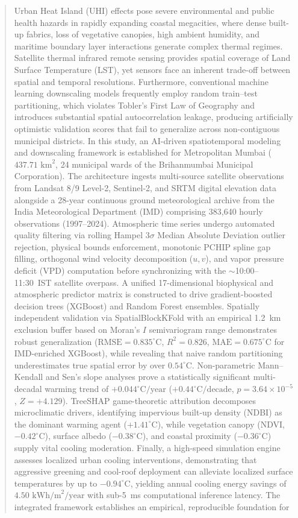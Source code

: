 \documentclass[a4paper,fleqn]{cas-sc}
\begin{document}
\begin{abstract}
Urban Heat Island (UHI) effects pose severe environmental and public health hazards in rapidly expanding coastal megacities, where dense built-up fabrics, loss of vegetative canopies, high ambient humidity, and maritime boundary layer interactions generate complex thermal regimes. Satellite thermal infrared remote sensing provides spatial coverage of Land Surface Temperature (LST), yet sensors face an inherent trade-off between spatial and temporal resolutions. Furthermore, conventional machine learning downscaling models frequently employ random train--test partitioning, which violates Tobler's First Law of Geography and introduces substantial spatial autocorrelation leakage, producing artificially optimistic validation scores that fail to generalize across non-contiguous municipal districts. In this study, an AI-driven spatiotemporal modeling and downscaling framework is established for Metropolitan Mumbai ($437.71\text{ km}^2$, 24 municipal wards of the Brihanmumbai Municipal Corporation). The architecture ingests multi-source satellite observations from Landsat 8/9 Level-2, Sentinel-2, and SRTM digital elevation data alongside a 28-year continuous ground meteorological archive from the India Meteorological Department (IMD) comprising 383,640 hourly observations (1997--2024). Atmospheric time series undergo automated quality filtering via rolling Hampel $3\sigma$ Median Absolute Deviation outlier rejection, physical bounds enforcement, monotonic PCHIP spline gap filling, orthogonal wind velocity decomposition ($u, v$), and vapor pressure deficit (VPD) computation before synchronizing with the $\sim$10:00--11:30~IST satellite overpass. A unified 17-dimensional biophysical and atmospheric predictor matrix is constructed to drive gradient-boosted decision trees (XGBoost) and Random Forest ensembles. Spatially independent validation via SpatialBlockKFold with an empirical 1.2~km exclusion buffer based on Moran's $I$ semivariogram range demonstrates robust generalization ($\text{RMSE} = 0.835^\circ\text{C}$, $R^2 = 0.826$, $\text{MAE} = 0.675^\circ\text{C}$ for IMD-enriched XGBoost), while revealing that naive random partitioning underestimates true spatial error by over $0.54^\circ\text{C}$. Non-parametric Mann--Kendall and Sen's slope analyses prove a statistically significant multi-decadal warming trend of $+0.044^\circ\text{C}/\text{year}$ ($+0.44^\circ\text{C}/\text{decade}$, $p = 3.64 \times 10^{-5}$, $Z = +4.129$). TreeSHAP game-theoretic attribution decomposes microclimatic drivers, identifying impervious built-up density (NDBI) as the dominant warming agent ($+1.41^\circ\text{C}$), while vegetation canopy (NDVI, $-0.42^\circ\text{C}$), surface albedo ($-0.38^\circ\text{C}$), and coastal proximity ($-0.36^\circ\text{C}$) supply vital cooling moderation. Finally, a high-speed simulation engine assesses localized urban cooling interventions, demonstrating that aggressive greening and cool-roof deployment can alleviate localized surface temperatures by up to $-0.94^\circ\text{C}$, yielding annual cooling energy savings of $4.50\text{ kWh/m}^2/\text{year}$ with sub-5~ms computational inference latency. The integrated framework establishes an empirical, reproducible foundation for 
\end{abstract}
\end{document}

